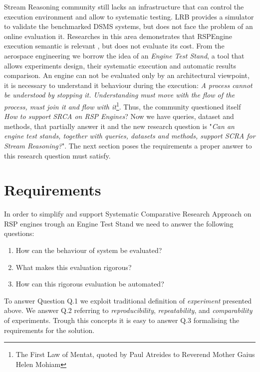 Stream Reasoning community still lacks an infrastructure that can control the execution environment and allow to systematic testing. LRB provides a simulator to validate the benchmarked DSMS systems, but does not face the problem of an online evaluation it. Researches in this area demonstrates that RSPEngine execution semantic is relevant \cite{Botan:2010:SMA:1920841.1920874}, but does not evaluate its cost. From the aerospace engineering we borrow the idea of an \textit{Engine Test Stand}, a tool that allows experiments design, their systematic execution and automatic results comparison. An engine can not be evaluated only by an architectural viewpoint, it is necessary to understand it behaviour during the execution: \textit{A process cannot be understood by stopping it. Understanding must move with the flow of the process, must join it and flow with it}\footnote{The First Law of Mentat, quoted by Paul Atreides to Reverend Mother Gaius Helen Mohiam}. Thus, the community questioned itself \textit{How to support SRCA on RSP Engines}? Now we have queries, dataset and methods, that partially answer it and the new research question is "\textit{Can an engine test stands, together with queries, datasets and methods, support SCRA for Stream Reasoning?}". The next section poses the requirements a proper answer to this research question must satisfy.

\section{Requirements} \label{sec:requirements}

In order to simplify and support Systematic Comparative Research Approach on RSP engines trough an Engine Test Stand we need to answer the following questions: 
\begin{enumerate}
\item[Q.1] How can the behaviour of system be evaluated? 
\item[Q.2] What makes this evaluation rigorous? 
\item[Q.3] How can this rigorous evaluation be automated?
\end{enumerate} To answer Question Q.1 we exploit traditional definition of \textit{experiment} presented above. We answer Q.2 referring to \textit{reproducibility}, \textit{repeatability}, and \textit{comparability} of experiments. Trough this concepts it is easy to answer Q.3 formalising the requirements for the solution.

